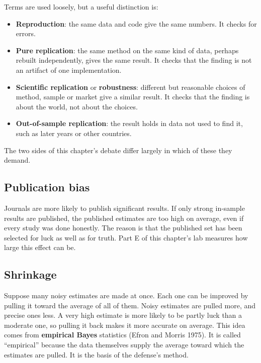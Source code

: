 Terms are used loosely, but a useful distinction is:

\begin{itemize}
  \item \textbf{Reproduction}: the same data and code give the same numbers. It checks for errors.
  \item \textbf{Pure replication}: the same method on the same kind of data, perhaps rebuilt independently, gives the same result. It checks that the finding is not an artifact of one implementation.
  \item \textbf{Scientific replication} or \textbf{robustness}: different but reasonable choices of method, sample or market give a similar result. It checks that the finding is about the world, not about the choices.
  \item \textbf{Out-of-sample replication}: the result holds in data not used to find it, such as later years or other countries.
\end{itemize}

The two sides of this chapter's debate differ largely in which of these they demand.

\subsection{Publication bias}

Journals are more likely to publish significant results. If only strong in-sample results are published, the published estimates are too high on average, even if every study was done honestly. The reason is that the published set has been selected for luck as well as for truth. Part E of this chapter's lab measures how large this effect can be.

\subsection{Shrinkage}

Suppose many noisy estimates are made at once. Each one can be improved by pulling it toward the average of all of them. Noisy estimates are pulled more, and precise ones less. A very high estimate is more likely to be partly luck than a moderate one, so pulling it back makes it more accurate on average. This idea comes from \textbf{empirical Bayes} statistics (Efron and Morris 1975). It is called ``empirical'' because the data themselves supply the average toward which the estimates are pulled. It is the basis of the defense's method.

